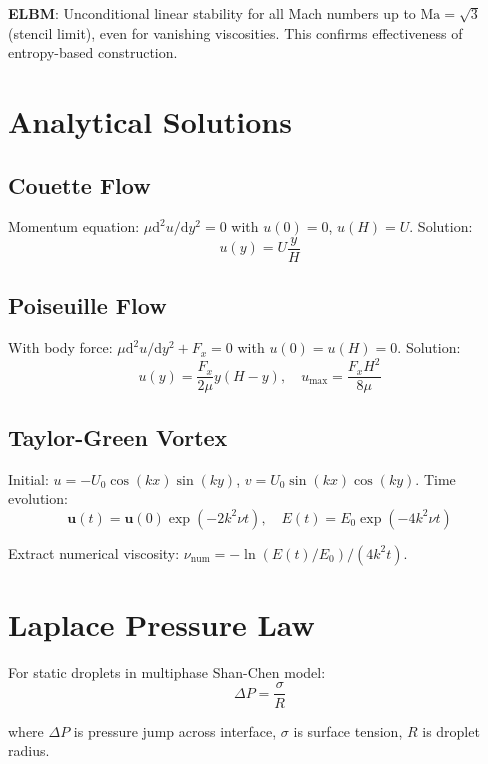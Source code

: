 \textbf{ELBM}: Unconditional linear stability for all Mach numbers up to $\mathrm{Ma} = \sqrt{3}$ (stencil limit), even for vanishing viscosities. This confirms effectiveness of entropy-based construction.

\section{Analytical Solutions}

\subsection{Couette Flow}
Momentum equation: $\mu \mathrm{d}^2u/\mathrm{d}y^2 = 0$ with $u(0)=0$, $u(H)=U$. Solution:
\begin{equation}
u(y) = U\frac{y}{H}
\end{equation}

\subsection{Poiseuille Flow}
With body force: $\mu \mathrm{d}^2u/\mathrm{d}y^2 + F_x = 0$ with $u(0)=u(H)=0$. Solution:
\begin{equation}
u(y) = \frac{F_x}{2\mu}y(H-y), \quad u_{\max} = \frac{F_x H^2}{8\mu}
\end{equation}

\subsection{Taylor-Green Vortex}
Initial: $u = -U_0\cos(kx)\sin(ky)$, $v = U_0\sin(kx)\cos(ky)$. Time evolution:
\begin{equation}
\mathbf{u}(t) = \mathbf{u}(0)\exp(-2k^2\nu t), \quad E(t) = E_0\exp(-4k^2\nu t)
\end{equation}

Extract numerical viscosity: $\nu_{\mathrm{num}} = -\ln(E(t)/E_0)/(4k^2t)$.

\section{Laplace Pressure Law}

For static droplets in multiphase Shan-Chen model:
\begin{equation}
\Delta P = \frac{\sigma}{R}
\end{equation}

where $\Delta P$ is pressure jump across interface, $\sigma$ is surface tension, $R$ is droplet radius.

